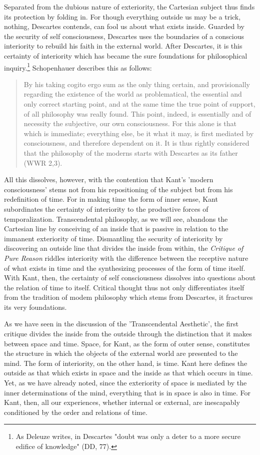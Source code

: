 Separated from the dubious nature of exteriority, the Cartesian subject thus finds its protection by folding in. For though everything outside us may be a trick, nothing, Descartes contends, can fool us about what exists inside. Guarded by the security of self consciousness, Descartes uses the boundaries of a conscious interiority to rebuild his faith in the external world. After Descartes, it is this certainty of interiority which has became the sure foundations for philosophical inquiry.\footnote{As Deleuze writes, in Descartes "doubt was only a deter to a more secure edifice of knowledge" (DD, 77).} Schopenhauer describes this as follows:

\begin{quote}
    By his taking cogito ergo sum as the only thing certain, and provisionally regarding the existence of the world as problematical, the essential and only correct starting point, and at the same time the true point of support, of all philosophy was really found. This point, indeed, is essentially and of necessity the subjective, our own consciousness. For this alone is that which is immediate; everything else, be it what it may, is first mediated by consciousness, and therefore dependent on it. It is thus rightly considered that the philosophy of the moderns starts with Descartes as its father (WWR 2,3).
\end{quote}

All this dissolves, however, with the contention that Kant's 'modern consciousness' stems not from his repositioning of the subject but from his redefinition of time. For in making time the form of inner sense, Kant subordinates the certainty of interiority to the productive forces of temporalization. Transcendental philosophy, as we will see, abandons the Cartesian line by conceiving of an inside that is passive in relation to the immanent exteriority of time. Dismantling the security of interiority by discovering an outside line that divides the inside from within, the \textit{Critique of Pure Reason} riddles interiority with the difference between the receptive nature of what exists in time and the synthesizing processes of the form of time itself. With Kant, then, the certainty of self consciousness dissolves into questions about the relation of time to itself. Critical thought thus not only differentiates itself from the tradition of modem philosophy which stems from Descartes, it fractures its very foundations.

As we have seen in the discussion of the 'Transcendental Aesthetic', the first critique divides the inside from the outside through the distinction that it makes between space and time. Space, for Kant, as the form of outer sense, constitutes the structure in which the objects of the external world are presented to the mind. The form of interiority, on the other hand, is time. Kant here defines the outside as that which exists in space and the inside as that which occurs in time. Yet, as we have already noted, since the exteriority of space is mediated by the inner determinations of the mind, everything that is in space is also in time. For Kant, then, all our experiences, whether internal or external, are inescapably conditioned by the order and relations of time.

